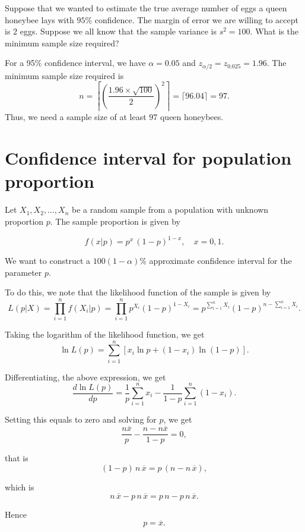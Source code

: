 \begin{example}
    Suppose that we wanted to estimate the true average number of eggs a queen honeybee lays with 
    $95\%$ confidence. The margin of error we are willing to accept is $2$ eggs. 
    Suppose we all know that the sample variance is $s^2 = 100$. What is the minimum sample size required?
\end{example}
\begin{solution}
    For a 95\% confidence interval, we have $\alpha = 0.05$ and $z_{\alpha / 2} = z_{0.025} = 1.96$. 
    The minimum sample size required is
    \[
        n = \left\lceil \left(\frac{1.96 \times \sqrt{100}}{2}\right)^2 \right\rceil = \lceil 96.04 \rceil = 97.
    \]
    Thus, we need a sample size of at least $97$ queen honeybees.
\end{solution}

\section{Confidence interval for population proportion}

Let $X_1, X_2, \ldots, X_n$ be a random sample from a population with unknown proportion $p$. The sample proportion is given by

\[
 f(x|p) = p^x \,(1 - p)^{1-x}, \quad x = 0, 1.
\]

We want to construct a $100(1 - \alpha)\%$ approximate confidence interval for the parameter $p$.

To do this, we note that the likelihood function of the sample is given by 
\[
    L(p|X) = \prod_{i=1}^{n} f(X_i|p) = \prod_{i=1}^{n} p^{X_i} (1-p)^{1-X_i} = p^{\sum_{i=1}^{n} X_i} (1-p)^{n - \sum_{i=1}^{n} X_i}.
\]

Taking the logarithm of the likelihood function, we get
\[
    \ln L(p) = \sum_{i=1}^{n} [x_i \ln p + (1 - x_i) \ln(1 - p)].
\]

Differentiating, the above expression, we get
\[
    \frac{d \ln L(p)}{dp} = \frac{1}{p} \sum_{i=1}^{n} x_i - \frac{1}{1 - p} \sum_{i=1}^{n} (1 - x_i).
\]

Setting this equals to zero and solving for $p$, we get
\[
    \frac{n\overline{x}}{p} - \frac{n - n\overline{x}}{1 - p} = 0,
\]

that is
\[
    (1 - p)\, n\, \overline{x} = p\, (n - n\, \overline{x}),
\]

which is
\[
    n\, \overline{x} - p\, n\, \overline{x} = p\, n - p\, n\, \overline{x}.
\]

Hence
\[
    p = \overline{x}.
\]

